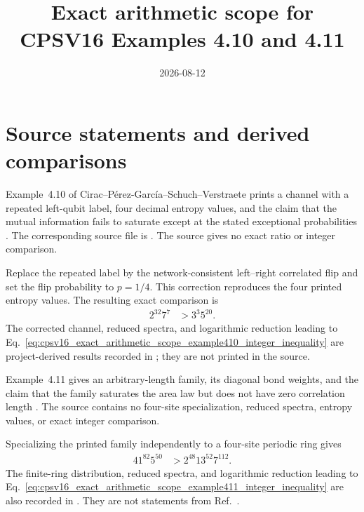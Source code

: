 \documentclass{article}
\title{Exact arithmetic scope for CPSV16 Examples 4.10 and 4.11}
\author{}
\date{2026-08-12}
\begin{document}
\maketitle
{}

\section{Source statements and derived comparisons}

Example~4.10 of Cirac--P\'erez-Garc\'ia--Schuch--Verstraete prints a channel
with a repeated left-qubit label, four decimal entropy values, and the claim
that the mutual information fails to saturate except at the stated exceptional
probabilities
\cite[lines~897--905]{Cirac2016MPDO_arXiv}. The corresponding source file is
. The source gives no
exact ratio or integer comparison.

Replace the repeated label by the network-consistent left--right correlated
flip and set the flip probability to $p=1/4$. This correction reproduces the
four printed entropy values. The resulting exact comparison is
\begin{align}
    2^{32}7^7
        &> 3^3 5^{20}.
    \label{eq:cpsv16_exact_arithmetic_scope_example410_integer_inequality}
\end{align}
The corrected channel, reduced spectra, and logarithmic reduction leading to
Eq.~\ref{eq:cpsv16_exact_arithmetic_scope_example410_integer_inequality} are
project-derived results recorded in
; they are not
printed in the source.

Example~4.11 gives an arbitrary-length family, its diagonal bond weights, and
the claim that the family saturates the area law but does not have zero
correlation length
\cite[lines~907--924]{Cirac2016MPDO_arXiv}. The source contains no four-site
specialization, reduced spectra, entropy values, or exact integer comparison.

Specializing the printed family independently to a four-site periodic ring
gives
\begin{align}
    41^{82}5^{50}
        &> 2^{48}13^{52}7^{112}.
    \label{eq:cpsv16_exact_arithmetic_scope_example411_integer_inequality}
\end{align}
The finite-ring distribution, reduced spectra, and logarithmic reduction
leading to
Eq.~\ref{eq:cpsv16_exact_arithmetic_scope_example411_integer_inequality} are
also recorded in
. They are not
statements from Ref.~\cite{Cirac2016MPDO_arXiv}.
\end{document}
